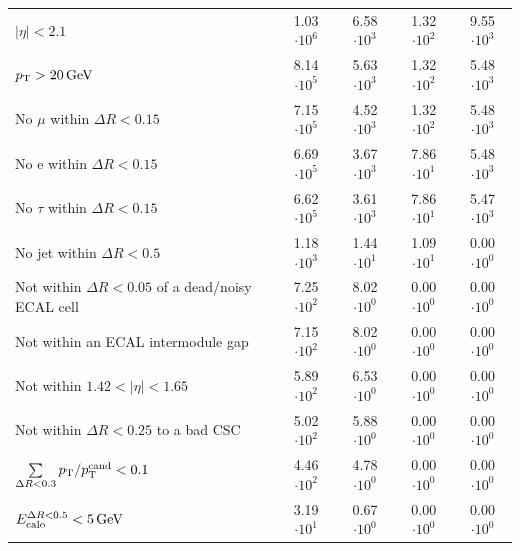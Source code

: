 \begin{table}[!h]
{\begin{tabular}{|l|c|c|c|c|}
$|\eta|<2.1$                                                                              & 1.03 $\cdot10^{6 }$ & 6.58 $\cdot10^{3 }$ & 1.32 $\cdot10^{2 }$ & 9.55 $\cdot10^{3 }$ \\
$p_{\text{T}}>20\,\text{Ge}\kern-0.06667em\text{V}$                                                                              & 8.14 $\cdot10^{5 }$ & 5.63 $\cdot10^{3 }$ & 1.32 $\cdot10^{2 }$ & 5.48 $\cdot10^{3 }$ \\
No $\mu$ within $\Delta R<0.15$                                                           & 7.15 $\cdot10^{5 }$ & 4.52 $\cdot10^{3 }$ & 1.32 $\cdot10^{2 }$ & 5.48 $\cdot10^{3 }$ \\
No e within $\Delta R<0.15$                                                               & 6.69 $\cdot10^{5 }$ & 3.67 $\cdot10^{3 }$ & 7.86 $\cdot10^{1 }$ & 5.48 $\cdot10^{3 }$ \\
No $\tau$ within $\Delta R<0.15$                                                          & 6.62 $\cdot10^{5 }$ & 3.61 $\cdot10^{3 }$ & 7.86 $\cdot10^{1 }$ & 5.47 $\cdot10^{3 }$ \\
No jet within $\Delta R<0.5$                                                              & 1.18 $\cdot10^{3 }$ & 1.44 $\cdot10^{1 }$ & 1.09 $\cdot10^{1 }$ & 0.00 $\cdot10^{0 }$ \\
\makecell[l]{Not within $\Delta R<0.05$ of \\\hfill a dead/noisy ECAL cell}               & 7.25 $\cdot10^{2 }$ & 8.02 $\cdot10^{0 }$ & 0.00 $\cdot10^{0 }$ & 0.00 $\cdot10^{0 }$ \\
Not within an ECAL  intermodule gap                                                       & 7.15 $\cdot10^{2 }$ & 8.02 $\cdot10^{0 }$ & 0.00 $\cdot10^{0 }$ & 0.00 $\cdot10^{0 }$ \\
Not within $1.42<|\eta|<1.65$                                                             & 5.89 $\cdot10^{2 }$ & 6.53 $\cdot10^{0 }$ & 0.00 $\cdot10^{0 }$ & 0.00 $\cdot10^{0 }$ \\
Not within $\Delta R<0.25$ to a bad CSC                                                   & 5.02 $\cdot10^{2 }$ & 5.88 $\cdot10^{0 }$ & 0.00 $\cdot10^{0 }$ & 0.00 $\cdot10^{0 }$ \\
$\sum \limits_{\Delta R < 0.3} p_{\text{T}}/p_{\text{T}}^{\text{cand}} < 0.1$                      & 4.46 $\cdot10^{2 }$ & 4.78 $\cdot10^{0 }$ & 0.00 $\cdot10^{0 }$ & 0.00 $\cdot10^{0 }$ \\
$E^{\Delta R<0.5}_{\text{calo}}<5\,\text{Ge}\kern-0.06667em\text{V}$                                                                            & 3.19 $\cdot10^{1 }$ & 0.67 $\cdot10^{0 }$ & 0.00 $\cdot10^{0 }$ & 0.00 $\cdot10^{0 }$ \\
\bottomrule
\end{tabular}}
\end{table}  

